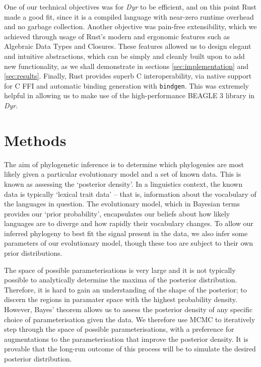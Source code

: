 \documentclass[10pt,journal,compsoc]{IEEEtran}
\begin{document}
One of our technical objectives was for \textit{Dyr} to be efficient, and on this point Rust made a good fit, since it is a compiled language with near-zero runtime overhead and no garbage collection. Another objective was pain-free extensibility, which we achieved through usage of Rust's modern and ergonomic features such as Algebraic Data Types and Closures. These features allowed us to design elegant and intuitive abstractions, which can be simply and cleanly built upon to add new functionality, as we shall demonstrate in sections \ref{sec:implementation} and \ref{sec:results}. Finally, Rust provides superb C interoperability, via native support for C FFI and automatic binding generation with \texttt{bindgen}. This was extremely helpful in allowing us to make use of the high-performance BEAGLE 3 library in \textit{Dyr}.

\section{Methods}\label{sec:methods}

The aim of phylogenetic inference is to determine which phylogenies are most likely given a particular evolutionary model and a set of known data. This is known as assessing the `posterior density'. In a linguistics context, the known data is typically `lexical trait data' -- that is, information about the vocabulary of the languages in question. The evolutionary model, which in Bayesian terms provides our `prior probability', encapsulates our beliefs about how likely languages are to diverge and how rapidly their vocabulary changes. To allow our inferred phylogeny to best fit the signal present in the data, we also infer some parameters of our evolutionary model, though these too are subject to their own prior distributions.

The space of possible parameterisations is very large and it is not typically possible to analytically determine the maxima of the posterior distribution. Therefore, it is hard to gain an understanding of the shape of the posterior; to discern the regions in paramater space with the highest probability density. However, Bayes' theorem allows us to assess the posterior density of any specific choice of parameterisation given the data. We therefore use MCMC to iteratively step through the space of possible parameterisations, with a preference for augmentations to the parameterisation that improve the posterior density. It is provable that the long-run outcome of this process will be to simulate the desired posterior distribution.
\end{document}
